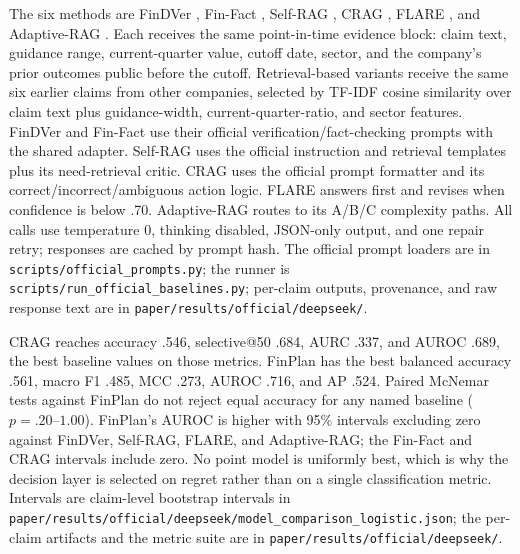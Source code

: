 \documentclass[11pt]{article}
\begin{document}
The six methods are FinDVer \citep{zhao2024findver}, Fin-Fact
\citep{rangapur2025finfact}, Self-RAG \citep{asai2024selfrag}, CRAG
\citep{yan2024crag}, FLARE \citep{jiang2023flare}, and Adaptive-RAG
\citep{jeong2024adaptiverag}. Each receives the same point-in-time evidence
block: claim text, guidance range, current-quarter value, cutoff date, sector,
and the company's prior outcomes public before the cutoff. Retrieval-based
variants receive the same six earlier claims from other companies, selected by
TF-IDF cosine similarity over claim text plus guidance-width,
current-quarter-ratio, and sector features. FinDVer and Fin-Fact use their
official verification/fact-checking prompts with the shared adapter. Self-RAG
uses the official instruction and retrieval templates plus its need-retrieval
critic. CRAG uses the official prompt formatter and its
correct/incorrect/ambiguous action logic. FLARE answers first and revises when
confidence is below .70. Adaptive-RAG routes to its A/B/C complexity paths. All
calls use temperature 0, thinking disabled, JSON-only output, and one repair
retry; responses are cached by prompt hash. The official prompt loaders are in
\texttt{scripts/\allowbreak official\_prompts.py}; the runner is
\texttt{scripts/\allowbreak run\_official\_baselines.py}; per-claim outputs,
provenance, and raw response text are in
\texttt{paper/\allowbreak results/\allowbreak official/\allowbreak deepseek/}.

CRAG reaches accuracy .546, selective@50 .684, AURC .337, and AUROC .689, the
best baseline values on those metrics. FinPlan has the best balanced accuracy
.561, macro F1 .485, MCC .273, AUROC .716, and AP .524. Paired McNemar tests
against FinPlan do not reject equal accuracy for any named baseline
($p=.20$--$1.00$). FinPlan's AUROC is higher with 95\% intervals excluding zero
against FinDVer, Self-RAG, FLARE, and Adaptive-RAG; the Fin-Fact and CRAG
intervals include zero. No point model is uniformly best, which is why the
decision layer is selected on regret rather than on a single classification
metric. Intervals are claim-level bootstrap intervals in
\texttt{paper/\allowbreak results/\allowbreak official/\allowbreak deepseek/\allowbreak model\_comparison\_logistic.json};
the per-claim artifacts and the metric suite are in
\texttt{paper/\allowbreak results/\allowbreak official/\allowbreak deepseek/}.
\end{document}

